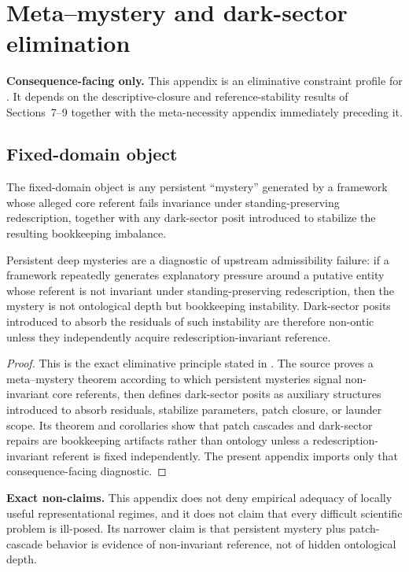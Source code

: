 \section{Meta--mystery and dark-sector elimination}
\label{app:dark-sector}

\begin{fixedbox}
\textbf{Consequence-facing only.} This appendix is an eliminative constraint profile for \metamysterydoc{}. It depends on the descriptive-closure and reference-stability results of Sections~7--9 together with the meta-necessity appendix immediately preceding it.
\end{fixedbox}

\subsection*{Fixed-domain object}
The fixed-domain object is any persistent ``mystery'' generated by a framework whose alleged core referent fails invariance under standing-preserving redescription, together with any dark-sector posit introduced to stabilize the resulting bookkeeping imbalance.

\begin{proposition}
Persistent deep mysteries are a diagnostic of upstream admissibility failure: if a framework repeatedly generates explanatory pressure around a putative entity whose referent is not invariant under standing-preserving redescription, then the mystery is not ontological depth but bookkeeping instability. Dark-sector posits introduced to absorb the residuals of such instability are therefore non-ontic unless they independently acquire redescription-invariant reference.
\end{proposition}

\begin{proof}
This is the exact eliminative principle stated in \metamysterydoc{}. The source proves a meta--mystery theorem according to which persistent mysteries signal non-invariant core referents, then defines dark-sector posits as auxiliary structures introduced to absorb residuals, stabilize parameters, patch closure, or launder scope. Its theorem and corollaries show that patch cascades and dark-sector repairs are bookkeeping artifacts rather than ontology unless a redescription-invariant referent is fixed independently. The present appendix imports only that consequence-facing diagnostic.\cite{MaleyMetaMystery}
\end{proof}

\begin{reviewbox}
\textbf{Exact non-claims.} This appendix does not deny empirical adequacy of locally useful representational regimes, and it does not claim that every difficult scientific problem is ill-posed. Its narrower claim is that persistent mystery plus patch-cascade behavior is evidence of non-invariant reference, not of hidden ontological depth.\cite{MaleyMetaMystery}
\end{reviewbox}
